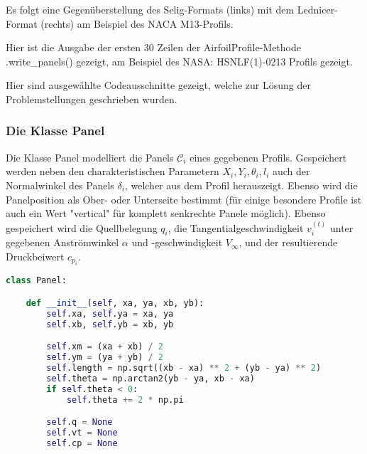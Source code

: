 \appendix

\label{appendix:a}

Es folgt eine Gegenüberstellung des Selig-Formats (links) mit dem Lednicer-Format (rechts) am Beispiel des NACA M13-Profils.

\begin{minipage}{0.45\textwidth}

\end{minipage}
    \hfill
\begin{minipage}{0.45\textwidth}

\end{minipage}

\newpage
{}
\label{appendix:b}
Hier ist die Ausgabe der ersten 30 Zeilen der AirfoilProfile-Methode .write\_panels() gezeigt, am Beispiel des NASA: HSNLF(1)-0213 Profils gezeigt.



\newpage
{}
\label{appendix:c}
Hier sind ausgewählte Codeausschnitte gezeigt, welche zur Lösung der Problemstellungen geschrieben wurden.
\subsubsection{Die Klasse Panel}
Die Klasse Panel modelliert die Panels $\mathcal{C}_i$ eines gegebenen Profils. Gespeichert werden neben den charakteristischen Parametern $X_i, Y_i, \theta _i, l_i$ auch der Normalwinkel des Panels $\delta_i$, welcher aus dem Profil herauszeigt. Ebenso wird die Panelposition als Ober- oder Unterseite bestimmt (für einige besondere Profile ist auch ein Wert "vertical" für komplett senkrechte Panele möglich). Ebenso gespeichert wird die Quellbelegung $q_i$, die Tangentialgeschwindigkeit $v_i^{(t)}$ unter gegebenen Anströmwinkel $\alpha $ und -geschwindigkeit $V_{\infty}$, und der resultierende Druckbeiwert $c_{p_i}$.
\begin{lstlisting}[language=Python]
class Panel:

    def __init__(self, xa, ya, xb, yb):
        self.xa, self.ya = xa, ya
        self.xb, self.yb = xb, yb

        self.xm = (xa + xb) / 2
        self.ym = (ya + yb) / 2
        self.length = np.sqrt((xb - xa) ** 2 + (yb - ya) ** 2)
        self.theta = np.arctan2(yb - ya, xb - xa)
        if self.theta < 0:
            self.theta += 2 * np.pi

        self.q = None
        self.vt = None
        self.cp = None
\end{lstlisting}

